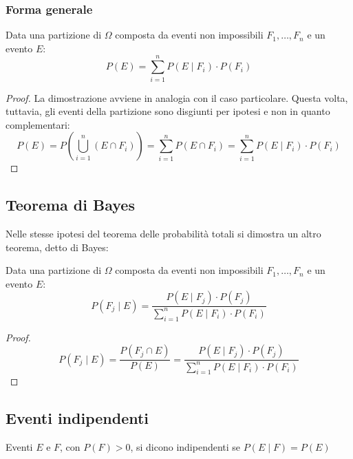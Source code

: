 \subsubsection{Forma generale}
\begin{teor}
	Data una partizione di $\Omega$ composta da eventi non impossibili $F_1,\dots, F_n$ e un evento $E$:
	\begin{equation*}
		P(E)= \sum_{i=1}^n P(E \mid F_i)\cdot P(F_i)
	\end{equation*}
\end{teor}
\begin{proof}
	La dimostrazione avviene in analogia con il caso particolare. Questa volta, tuttavia, gli eventi della partizione sono disgiunti per ipotesi e non in quanto complementari:
	\begin{equation*}
		P(E)=P \left(\bigcup_{i=1}^n (E\cap F_i) \right) = \sum_{i=1}^n P(E\cap F_i) = \sum_{i=1}^n P(E \mid F_i)\cdot P(F_i)
	\end{equation*}
\end{proof}


\subsection{Teorema di Bayes}
Nelle stesse ipotesi del teorema delle probabilità totali si dimostra un altro teorema, detto di Bayes:
\begin{teor}[di Bayes]
	Data una partizione di $\Omega$ composta da eventi non impossibili $F_1,\dots, F_n$ e un evento $E$:
	\begin{equation*}
		P(F_j\mid E)=\frac{P(E\mid F_j)\cdot P(F_j)}{\sum\limits_{i=1}^n P(E \mid F_i)\cdot P(F_i)}
	\end{equation*}
\end{teor}

\begin{proof}
	\begin{equation*}
		P(F_j\mid E)=\frac{P(F_j \cap E)}{P(E)}=\frac{P(E\mid F_j)\cdot P(F_j)}{\sum\limits_{i=1}^n P(E \mid F_i)\cdot P(F_i)}
	\end{equation*}
\end{proof}



\subsection{Eventi indipendenti}
\begin{defin}
	Eventi $E$ e $F$, con $P(F)>0$, si dicono indipendenti se $P(E \mid F)=P(E)$
\end{defin}


